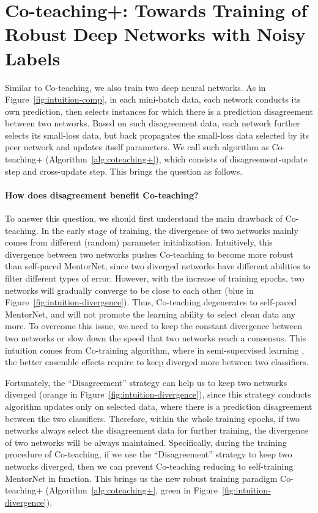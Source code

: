 \documentclass{article}
\begin{document}
\section{Co-teaching+: Towards Training of Robust Deep Networks with Noisy Labels}
\label{sect:coteaching+}

Similar to Co-teaching, we also train two deep neural networks. As in Figure~\ref{fig:intuition-comp}, in each mini-batch data, each network conducts its own prediction, then selects instances for which there is a prediction disagreement between two networks. Based on such disagreement data, each network further selects its small-loss data, but back propagates the small-loss data selected by its peer network and updates itself parameters. We call such algorithm as Co-teaching+ (Algorithm~\ref{alg:coteaching+}), which consists of disagreement-update step and cross-update step. This brings the question as follows.

\paragraph{How does disagreement benefit Co-teaching?}
To answer this question, we should first understand the main drawback of Co-teaching. In the early stage of training, the divergence of two networks mainly comes from different (random) parameter initialization. Intuitively, this divergence between two networks pushes Co-teaching to become more robust than self-paced MentorNet, since two diverged networks have different abilities to filter different types of error. However, with the increase of training epochs, two networks will gradually converge to be close to each other (blue in Figure~\ref{fig:intuition-divergence}). Thus, Co-teaching degenerates to self-paced MentorNet, and will not promote the learning ability to select clean data any more. To overcome this issue, we need to keep the constant divergence between two networks or slow down the speed that two networks reach a consensus. This intuition comes from Co-training algorithm, where in semi-supervised learning \cite{chapelle2009semi}, the better ensemble effects require to keep diverged more between two classifiers.

Fortunately, the ``Disagreement'' strategy \cite{malach2017decoupling} can help us to keep two networks diverged (orange in Figure~\ref{fig:intuition-divergence}), since this strategy conducts algorithm updates only on selected data, where there is a prediction disagreement between the two classifiers. Therefore, within the whole training epochs, if two networks always select the disagreement data for further training, the divergence of two networks will be always maintained. Specifically, during the training procedure of Co-teaching, if we use the ``Disagreement'' strategy to keep two networks diverged, then we can prevent Co-teaching reducing to self-training MentorNet in function. This brings us the new robust training paradigm Co-teaching+ (Algorithm~\ref{alg:coteaching+}, green in Figure~\ref{fig:intuition-divergence}).
\end{document}
